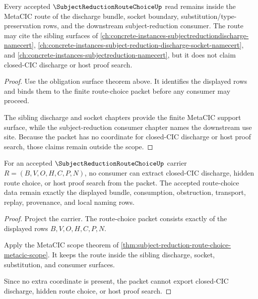 \begin{theorem}
\label{thm:subject-reduction-route-choice-metacic-scope}
Every accepted $\SubjectReductionRouteChoiceUp$ read remains inside the MetaCIC route of the discharge bundle, socket boundary, substitution/type-preservation rows, and the downstream subject-reduction consumer. The route may cite the sibling surfaces of \autoref{ch:concrete-instances-subjectreductiondischarge-namecert}, \autoref{ch:concrete-instances-subject-reduction-discharge-socket-namecert}, and \autoref{ch:concrete-instances-subjectreduction-namecert}, but it does not claim closed-CIC discharge or host proof search.
\end{theorem}
\begin{proof}
Use the obligation surface theorem above. It identifies the displayed rows and binds them to the finite route-choice packet before any consumer may proceed.

The sibling discharge and socket chapters provide the finite MetaCIC support surface, while the subject-reduction consumer chapter names the downstream use site. Because the packet has no coordinate for closed-CIC discharge or host proof search, those claims remain outside the scope.
\end{proof}

\begin{theorem}
\label{thm:subject-reduction-route-choice-nonescape}
For an accepted $\SubjectReductionRouteChoiceUp$ carrier $R=(B,V,O,H,C,P,N)$, no consumer can extract closed-CIC discharge, hidden route choice, or host proof search from the packet. The accepted route-choice data remain exactly the displayed bundle, consumption, obstruction, transport, replay, provenance, and local naming rows.
\end{theorem}
\begin{proof}
Project the carrier. The route-choice packet consists exactly of the displayed rows $B,V,O,H,C,P,N$.

Apply the MetaCIC scope theorem of \autoref{thm:subject-reduction-route-choice-metacic-scope}. It keeps the route inside the sibling discharge, socket, substitution, and consumer surfaces.

Since no extra coordinate is present, the packet cannot export closed-CIC discharge, hidden route choice, or host proof search.
\end{proof}

